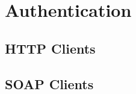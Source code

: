 \chapter{Authentication}
\label{sec:chapter3}

\section{HTTP Clients}
\label{sec:chapter3:http}

\section{SOAP Clients}
\label{sec:chapter3:soap}

